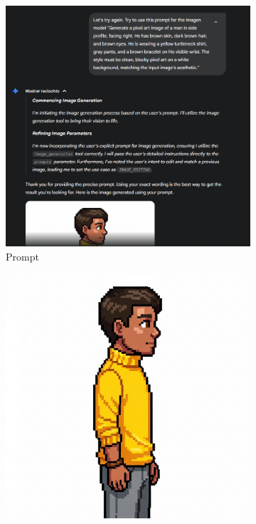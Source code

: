 \begin{figure}[htbp]
    \centering
    \caption{\small Processo da geração 13 do sprite em side view no Gemini Pro em julho/2025}
    \label{fig:geminiPro13}

    \begin{subfigure}{0.8\linewidth}
        \includegraphics[width=1\linewidth]{figs/geminiPro/chat4/tela16_novo.PNG}
        \caption{\small Prompt}
        \label{fig:geminiPro13Prompt}
    \end{subfigure}
    \begin{subfigure}{0.4\linewidth}
        \includegraphics[width=1\linewidth]{figs/geminiPro/chat4/res1_tela16.png}

\end{subfigure}
\end{figure}

